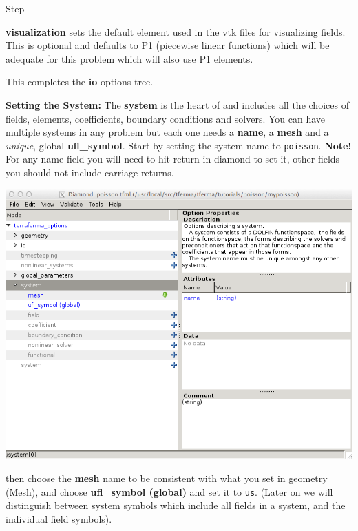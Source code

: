 \begin{steps}{Step}
\begin{center}
\end{center}
\textbf{visualization} sets the default element used in the vtk files
for visualizing fields.  This is optional and defaults to P1 (piecewise
linear functions) which will be adequate for this problem which will
also use P1 elements.

This completes the \textbf{io} options tree.
\item \textbf{Setting the System:}  The \textbf{system} is the heart of
  \TF{} and includes all the choices of fields, elements,
  coefficients, boundary
  conditions and solvers.  You can have multiple systems in any
  problem but each one needs a \textbf{name}, a \textbf{mesh} and a
  \emph{unique}, global \textbf{ufl\_symbol}.  Start by setting the system
  name to \texttt{poisson}.
\textbf{Note!}  For any name field you will need to hit return in
diamond to set it,  other fields you should not include carriage returns. 
\begin{center}
    \includegraphics[width=\diamondwidth]{figures/screendumps/diamond_poisson_05a.png}
\end{center}
then choose  the \textbf{mesh} name to be consistent with what you set in
geometry (Mesh), and choose \textbf{ufl\_symbol (global)} and set it to
\texttt{us}. (Later on we will distinguish between system symbols
which include all fields in a system, and the individual field
symbols).
\begin{center}

\end{center}
\end{steps}
